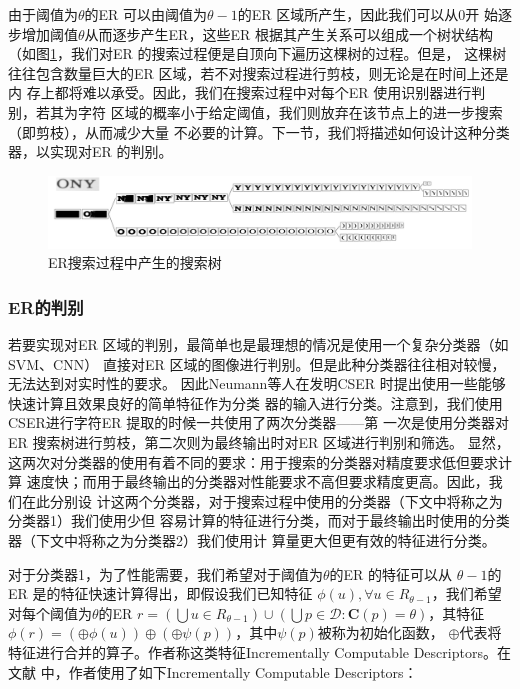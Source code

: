 由于阈值为$\theta$的ER 可以由阈值为$\theta-1$的ER 区域所产生，因此我们可以从0开
始逐步增加阈值$\theta$从而逐步产生ER，这些ER 根据其产生关系可以组成一个树状结构
（如图\ref{Fig:ERTree}，我们对ER 的搜索过程便是自顶向下遍历这棵树的过程。但是，
这棵树往往包含数量巨大的ER 区域，若不对搜索过程进行剪枝，则无论是在时间上还是内
存上都将难以承受。因此，我们在搜索过程中对每个ER 使用识别器进行判别，若其为字符
区域的概率小于给定阈值，我们则放弃在该节点上的进一步搜索（即剪枝），从而减少大量
不必要的计算。下一节，我们将描述如何设计这种分类器，以实现对ER 的判别。

\begin{figure}[ht]
  \centering
  \includegraphics[width=0.8\linewidth]{./Figure/ERTree.png}
  \caption{ER搜索过程中产生的搜索树}\label{Fig:ERTree}
\end{figure}

\subsubsection{ER的判别}

若要实现对ER 区域的判别，最简单也是最理想的情况是使用一个复杂分类器（如SVM、CNN）
直接对ER 区域的图像进行判别。但是此种分类器往往相对较慢，无法达到对实时性的要求。
因此Neumann等人在发明CSER 时提出使用一些能够快速计算且效果良好的简单特征作为分类
器的输入进行分类。注意到，我们使用CSER进行字符ER 提取的时候一共使用了两次分类器——第
一次是使用分类器对ER 搜索树进行剪枝，第二次则为最终输出时对ER 区域进行判别和筛选。
显然，这两次对分类器的使用有着不同的要求：用于搜索的分类器对精度要求低但要求计算
速度快；而用于最终输出的分类器对性能要求不高但要求精度更高。因此，我们在此分别设
计这两个分类器，对于搜索过程中使用的分类器（下文中将称之为分类器1）我们使用少但
容易计算的特征进行分类，而对于最终输出时使用的分类器（下文中将称之为分类器2）我们使用计
算量更大但更有效的特征进行分类。

对于分类器1，为了性能需要，我们希望对于阈值为$\theta$的ER 的特征可以从
$\theta-1$的ER 是的特征快速计算得出，即假设我们已知特征 $\phi(u), \forall{u \in
  R_{\theta-1}}$，我们希望对每个阈值为$\theta$的ER $r = \left(
  \bigcup{u \in R_{\theta-1}} \right) \cup \left( \bigcup{p \in \mathcal{D}} :
  \mathbf{C}(p) = \theta \right)$，其特征$\phi(r) = \left( \oplus{\phi(u)}
\right) \oplus \left( \oplus{\psi(p)} \right)$，其中$\psi(p)$被称为初始化函数，
$\oplus$代表将特征进行合并的算子。作者称这类特征Incrementally Computable Descriptors。在文献
\cite{Neumann:2012ik}中，作者使用了如下Incrementally Computable Descriptors：

